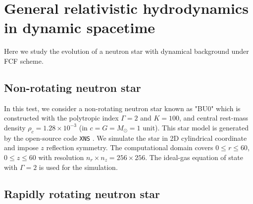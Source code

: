 \section{General relativistic hydrodynamics in dynamic spacetime} %
\label{section4.3}
Here we study the evolution of a neutron star with dynamical background under FCF scheme.
\subsection{Non-rotating neutron star}
In this test, we consider a non-rotating neutron star known as "BU0" \cite{dimmelmeier2006non}
which is constructed with the polytropic index $\Gamma = 2$ and $K = 100$,
and central rest-mass density $\rho_c = 1.28 \times 10^{-3}$ (in $c=G=M_\odot=1$ unit).
This star model is generated by the open-source code \texttt{XNS} 
\cite{bucciantini2011general,pili2014axisymmetric,pili2015general,pili2017general}.
We simulate the star in 2D cylindrical coordinate and impose $z$ reflection symmetry.
The computational domain covers $0 \leq r \leq 60$, $0\leq z \leq 60$ 
with resolution $n_r \times n_z = 256 \times 256$.
The ideal-gas equation of state with $\Gamma = 2$ is used for the simulation.

\subsection{Rapidly rotating neutron star}

